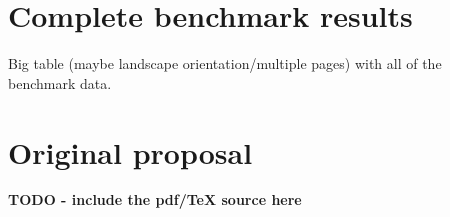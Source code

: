 
\cleardoublepage

\nocite{*}
\printbibliography[heading=bibintoc]

\appendix

\cleardoublepage

\chapter{Complete benchmark results}

Big table (maybe landscape orientation/multiple pages) with all of the benchmark data.

\chapter{Original proposal}

\textbf{TODO - include the pdf/TeX source here}